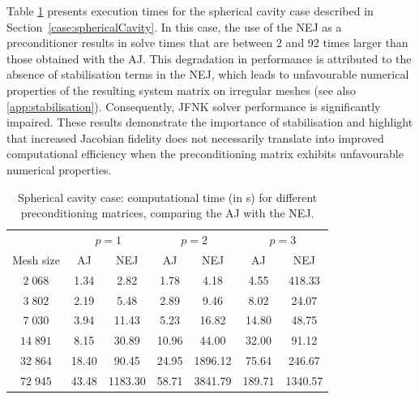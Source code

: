 \documentclass[review,3p]{elsarticle}
\begin{document}
Table \ref{tab:AJvsTJ-SC} presents execution times for the spherical cavity case described in Section~\ref{case:sphericalCavity}.
In this case, the use of the NEJ as a preconditioner results in solve times that are between 2 and 92 times larger than those obtained with the AJ.
This degradation in performance is attributed to the absence of stabilisation terms in the NEJ, which leads to unfavourable numerical properties of the resulting system matrix on irregular meshes (see also \ref{app:stabilisation}). Consequently, JFNK solver performance is significantly impaired. These results demonstrate the importance of stabilisation and highlight that increased Jacobian fidelity does not necessarily translate into improved computational efficiency when the preconditioning matrix exhibits unfavourable numerical properties.

\begin{table}[h]
	\centering
	\begin{tabular}{ccccccc}
		\multicolumn{1}{l}{} & \multicolumn{2}{c}{$p=1$} & \multicolumn{2}{c}{$p=2$} & \multicolumn{2}{c}{$p=3$} \\
		Mesh size             & AJ          & NEJ           & AJ          & NEJ           & AJ          & NEJ        \\ \hline
		$2\;068$                  & 1.34           & 2.82            & 1.78           & 4.18          & 4.55         &  418.33        \\
		$3\;802$                 & 2.19           & 5.48            & 2.89           & 9.46         & 8.02      &  24.07             \\
		$7\;030$                  & 3.94           & 11.43            & 5.23           & 16.82       & 14.80         &  48.75           \\
		$14\;891$                  & 8.15           & 30.89            & 10.96           & 44.00        & 32.00    &   91.12              \\
		$32\;864$                 & 18.40           & 90.45            & 24.95           & 1896.12         & 75.64  &   246.67                 \\
		$72\;945$                 & 43.48          & 1183.30          & 58.71         & 3841.79        & 189.71 &  1340.57              \\ \hline
	\end{tabular}
	\caption{Spherical cavity case: computational time (in s) for different preconditioning matrices, comparing the AJ with the NEJ.}
	\label{tab:AJvsTJ-SC}
\end{table}
%
%
%
%
\end{document}
